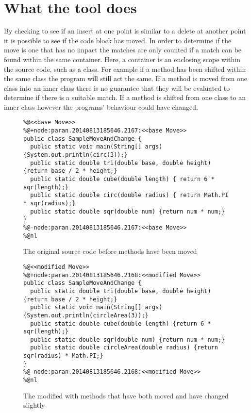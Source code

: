 \section{What the tool does}

By checking to see if an insert at one point is similar to a delete at another point it is possible to see if the code block has moved. In order to determine if the move is one that has no impact the matches are only counted if a match can be found within the same container.  Here, a container is an enclosing scope within the source code, such as a class. For example if a method has been shifted within the same class the program will still act the same.  If a method is moved from one class into an inner class there is no guarantee that they will be evaluated to determine if there is a suitable match.  If a method is shifted from one class to an inner class however the programs' behaviour could have changed.

\begin{figure}[!t]
\begin{lstlisting}
%@<<base Move>>
%@+node:paran.20140813185646.2167:<<base Move>>
public class SampleMoveAndChange {
  public static void main(String[] args) {System.out.println(circ(3));}
  public static double tri(double base, double height) {return base / 2 * height;}
  public static double cube(double length) { return 6 * sqr(length);}
  public static double circ(double radius) { return Math.PI * sqr(radius);}
  public static double sqr(double num) {return num * num;}
}
%@-node:paran.20140813185646.2167:<<base Move>>
%@nl
\end{lstlisting}
\caption{The original source code before methods have been moved}
 \label{fig:orig}
\end{figure}

\begin{figure}[!t]
\begin{lstlisting}
%@<<modified Move>>
%@+node:paran.20140813185646.2168:<<modified Move>>
public class SampleMoveAndChange {
  public static double tri(double base, double height) {return base / 2 * height;}
  public static void main(String[] args) {System.out.println(circleArea(3));}
  public static double cube(double length) {return 6 * sqr(length);}
  public static double sqr(double num) {return num * num;}
  public static double circleArea(double radius) {return sqr(radius) * Math.PI;}
}
%@-node:paran.20140813185646.2168:<<modified Move>>
%@nl
\end{lstlisting}
\caption{The modified with methods that have both moved and have changed slightly}
 \label{fig:orig}
\end{figure}


